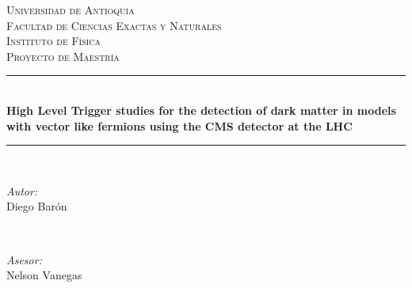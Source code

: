 \begin{titlepage}

\newcommand{\HRule}{\rule{\linewidth}{0.5mm}} %

\center %
 

\textsc{\LARGE Universidad de Antioquia}\\[1.5cm] %
\textsc{\Large Facultad de Ciencias Exactas y Naturales}\\[0.5cm]
\textsc{\Large Instituto de Física}\\[0.5cm]
\textsc{\large Proyecto de Maestría}\\[0.5cm] %


\HRule \\[0.4cm]
{ \huge \bfseries High Level Trigger studies for the detection of dark matter in models with vector like fermions using the CMS detector at the LHC}\\[0.4cm] %
\HRule \\[1.5cm]
 

\begin{minipage}{0.4\textwidth}
\begin{flushleft} \large
\emph{Autor:}\\
Diego Barón \textsc{} %
\end{flushleft}
\end{minipage}
~
\begin{minipage}{0.4\textwidth}
\begin{flushright} \large
\emph{Asesor:} \\
Nelson Vanegas \textsc{} %
\end{flushright}
\end{minipage}\\[1.2cm]


\end{titlepage}
